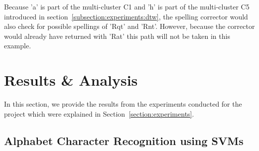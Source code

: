\documentclass[12pt]{article}
\begin{document}
	Because 'a' is part of the multi-cluster C1 and 'h' is part of the multi-cluster C5 introduced in section~\ref{subsection:experiments:dtw}, the spelling corrector would also check for possible spellings of 'Rqt' and 'Rnt'. However, because the corrector would already have returned with 'Rat' this path will not be taken in this example.	
	
\section{Results \& Analysis}
\label{section:results}
	In this section, we provide the results from the experiments conducted for the project which were explained in Section~\ref{section:experiments}. 
	
	\subsection{Alphabet Character Recognition using SVMs}
	\label{subsubsection:analysis:svm}
	
\end{document}
